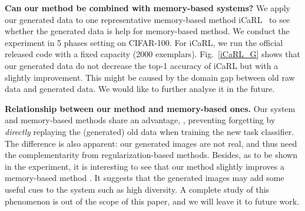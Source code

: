 \documentclass[10pt,twocolumn,letterpaper]{article}
\begin{document}
\textbf{Can our method be combined with memory-based systems?}
We apply our generated data to one representative memory-based method iCaRL~\cite{rebuffi2017icarl} to see whether the generated data is help for memory-based method. We conduct the experiment in 5 phases setting on CIFAR-100. 
For iCaRL,  we run the official released code with a fixed capacity (2000 exemplars). 
Fig.~\ref{iCaRL_G} shows that our generated data do not decrease the top-1 accuracy of iCaRL but with a slightly improvement. 
This might be caused by the domain gap between old raw data and generated data.  We would like to further analyse it in the future.

\textbf{Relationship between our method and memory-based ones.} Our system and memory-based methods share an advantage, \ie, preventing forgetting by \emph{directly} replaying the (generated) old data when training the new task classifier. The difference is also apparent: our generated images are not real, and thus need the complementarity from regularization-based methods. Besides, as to be shown in the experiment, it is interesting to see that our method slightly improves a memory-based method \cite{rebuffi2017icarl}. It suggests that the generated images may add some useful cues to the system such as high diversity. A complete study of this phenomenon is out of the scope of this paper, and we will leave it to future work.
\end{document}
